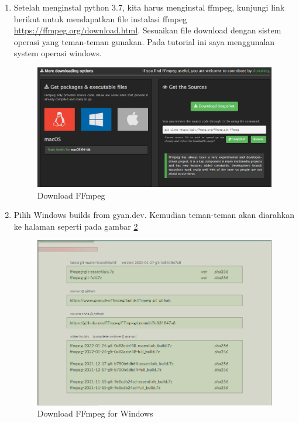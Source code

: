 \begin{enumerate}

\item Setelah menginstal python 3.7, kita harus menginstal ffmpeg, kunjungi link berikut untuk mendapatkan file instalasi ffmpeg \url{https://ffmpeg.org/download.html}. Sesuaikan file download dengan sistem operasi yang teman-teman gunakan. Pada tutorial ini saya menggunalan system operasi windows.
\begin{figure}[H]
\centering
\includegraphics[scale=.35]{figures/python5}
\caption{Download FFmpeg}
\label{python5}
\end{figure}

\item Pilih Windows builds from gyan.dev. Kemudian teman-teman akan diarahkan ke halaman seperti pada gambar \ref{python6}
\begin{figure}[H]
\centering
\includegraphics[scale=.4]{figures/python6}
\caption{Download FFmpeg for Windows}
\label{python6}
\end{figure}


\end{enumerate}

